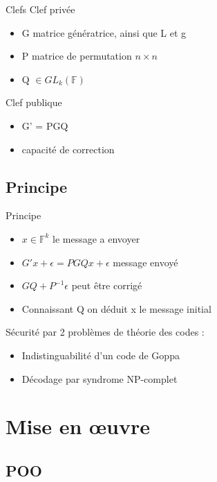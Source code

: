 \documentclass{beamer}
\begin{document}
			\begin{frame}{Clefs}
				Clef privée
				\begin{itemize}
					\item G matrice génératrice, ainsi que L et g
					\item P matrice de permutation $ n \times n$
					\item Q $\in GL_{k}(\mathbb{F})$
				\end{itemize}

				Clef publique
				\begin{itemize}
					\item G' = PGQ
					\item capacité de correction
				\end{itemize}
			
			\end{frame}

		\subsection{Principe}

			\begin{frame}{Principe}
				
				\begin{itemize}
					\item $x \in \mathbb{F}^{k}$ le message a envoyer
					\item $G'x + \epsilon = PGQx + \epsilon$ message envoyé
					\item $ GQ + P^{-1}\epsilon$ peut être corrigé
					\item Connaissant Q on déduit x le message initial
				\end{itemize}

				Sécurité par 2 problèmes de théorie des codes :
				\begin{itemize}
					\item Indistinguabilité d'un code de Goppa
					\item Décodage par syndrome NP-complet
				\end{itemize}

			\end{frame}

	\section{Mise en œuvre}

		\subsection{POO}
\end{document}
